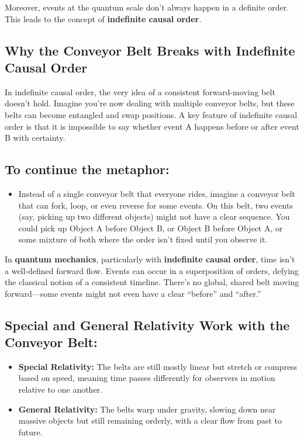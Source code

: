 Moreover, events at the quantum scale don’t always happen in a definite order. This leads to the concept of \textbf{indefinite causal order}.

\subsection{Why the Conveyor Belt Breaks with Indefinite Causal Order}

In indefinite causal order, the very idea of a consistent forward-moving belt doesn’t hold. Imagine you're now dealing with multiple conveyor belts, but these belts can become entangled and swap positions. A key feature of indefinite causal order is that it is impossible to say whether event A happens before or after event B with certainty.

\subsection*{To continue the metaphor:}

\begin{itemize}[leftmargin=1.5em]
\item Instead of a single conveyor belt that everyone rides, imagine a conveyor belt that can fork, loop, or even reverse for some events. On this belt, two events (say, picking up two different objects) might not have a clear sequence. You could pick up Object A before Object B, or Object B before Object A, or some mixture of both where the order isn't fixed until you observe it.
\end{itemize}

In \textbf{quantum mechanics}, particularly with \textbf{indefinite causal order}, time isn’t a well-defined forward flow. Events can occur in a superposition of orders, defying the classical notion of a consistent timeline. There’s no global, shared belt moving forward—some events might not even have a clear ``before'' and ``after.''

\subsection*{Special and General Relativity Work with the Conveyor Belt:}

\begin{itemize}[leftmargin=1.5em]
\item \textbf{Special Relativity:} The belts are still mostly linear but stretch or compress based on speed, meaning time passes differently for observers in motion relative to one another.
\item \textbf{General Relativity:} The belts warp under gravity, slowing down near massive objects but still remaining orderly, with a clear flow from past to future.
\end{itemize}

